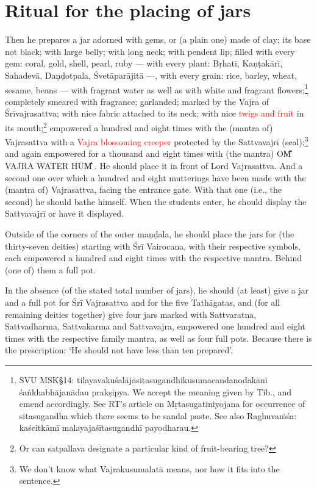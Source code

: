 \documentclass[11pt]{book}
\makeatletter
\def\fakesc#1{%
  \begingroup%
  \xdef\fake@name{\csname\curr@fontshape/\f@size\endcsname}%
  \fontsize{1.3\fontdimen8\fake@name}{\baselineskip}\selectfont%
  \uppercase{#1}%
  \endgroup%
}
\newcommand{\mantra}[1]{\fakesc{#1}}
\newcommand{\red}[1]{\textcolor{red}{#1}}
\makeatother
\begin{document}
\section{Ritual for the placing of jars}
Then he prepares a jar adorned with gems, or (a plain one) made of clay; its base not black; with large belly; with long neck; with pendent lip; filled with every gem: coral, gold, shell, pearl, ruby — with every plant: Bṛhatī, Kaṇṭakārī, Sahadevā, Daṇḍotpala, Śvetāparājitā —, with every grain: rice, barley, wheat, sesame, beans — with fragrant water as well as with white and fragrant flowers;\footnote{SVU MSK§14: tilayavakuśalājāsitasugandhikusumacandanodakāni śaṅkhabhājanādau prakṣipya. We accept the meaning given by Tib., and emend accordingly. See RT's article on Mṛtasugatiniyojana for occurrence of sitasugandha which there seems to be sandal paste. See also Raghuvaṁśa: kaścitkāmī malayajaśītasugandhī payodharau.} completely smeared with fragrance; garlanded; marked by the Vajra of Śrīvajrasattva; with nice fabric attached to its neck; with nice \red{twigs and fruit} in its mouth;\footnote{Or can satpallava designate a particular kind of fruit-bearing tree?} empowered a hundred and eight times with the (mantra of) Vajrasattva with a \red{Vajra blossoming creeper} protected by the Sattvavajrī (seal);\footnote{We don't know what Vajrakusumalatā means, nor how it fits into the sentence.} and again empowered for a thousand and eight times with (the mantra) \mantra{om̐ vajra water hūm̐}. He should place it in front of Lord Vajrasattva. And a second one over which a hundred and eight mutterings have been made with the (mantra of) Vajrasattva, facing the entrance gate. With that one (i.e., the second) he should bathe himself. When the students enter, he should display the Sattvavajrī or have it displayed. 

Outside of the corners of the outer maṇḍala, he should place the jars for (the thirty-seven deities) starting with Śrī Vairocana, with their respective  symbols, each empowered a hundred and eight times with the respective mantra. Behind (one of) them a full pot.

In the absence (of the stated total number of jars), he should (at least) give a jar and a full pot for Śrī Vajrasattva and for the five Tathāgatas, and (for all remaining deities together) give four jars marked with Sattvaratna, Sattvadharma, Sattvakarma and Sattvavajra, empowered one hundred and eight times with the respective family mantra, as well as four full pots. Because there is the prescription: `He should not have less than ten prepared'.
\end{document}
